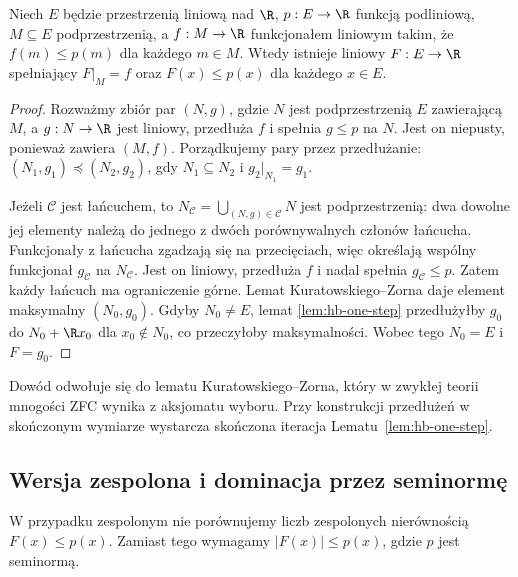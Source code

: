 \begin{twierdzenie}
\label{thm:hb-real}
Niech $E$ będzie przestrzenią liniową nad $\R$,
$p:E\to\R$ funkcją podliniową, $M\subseteq E$ podprzestrzenią,
a $f:M\to\R$ funkcjonałem liniowym takim, że
$f(m)\le p(m)$ dla każdego $m\in M$.
Wtedy istnieje liniowy $F:E\to\R$ spełniający
$F|_M=f$ oraz $F(x)\le p(x)$ dla każdego $x\in E$.
\end{twierdzenie}
\begin{proof}
Rozważmy zbiór par $(N,g)$, gdzie $N$ jest podprzestrzenią
$E$ zawierającą $M$, a $g:N\to\R$ jest liniowy, przedłuża
$f$ i spełnia $g\le p$ na $N$. Jest on niepusty, ponieważ
zawiera $(M,f)$. Porządkujemy pary przez przedłużanie:
$(N_1,g_1)\preceq(N_2,g_2)$, gdy $N_1\subseteq N_2$
i $g_2|_{N_1}=g_1$.

Jeżeli $\mathcal C$ jest łańcuchem, to $N_\mathcal C=
\bigcup_{(N,g)\in\mathcal C}N$ jest podprzestrzenią:
dwa dowolne jej elementy należą do jednego z dwóch
porównywalnych członów łańcucha. Funkcjonały z łańcucha
zgadzają się na przecięciach, więc określają wspólny
funkcjonał $g_\mathcal C$ na $N_\mathcal C$.
Jest on liniowy, przedłuża $f$ i nadal spełnia
$g_\mathcal C\le p$. Zatem każdy łańcuch ma ograniczenie
górne. Lemat Kuratowskiego--Zorna daje element maksymalny
$(N_0,g_0)$. Gdyby $N_0\ne E$, lemat
\ref{lem:hb-one-step} przedłużyłby $g_0$ do
$N_0+\R x_0$ dla $x_0\notin N_0$, co przeczyłoby
maksymalności. Wobec tego $N_0=E$ i $F=g_0$.
\end{proof}

\begin{uwaga}
Dowód odwołuje się do lematu Kuratowskiego--Zorna,
który w zwykłej teorii mnogości ZFC wynika z aksjomatu
wyboru. Przy konstrukcji przedłużeń w skończonym wymiarze
wystarcza skończona iteracja Lematu~\ref{lem:hb-one-step}.
\end{uwaga}

\subsection{Wersja zespolona i dominacja przez seminormę}

W przypadku zespolonym nie porównujemy liczb zespolonych
nierównością $F(x)\le p(x)$. Zamiast tego wymagamy
$|F(x)|\le p(x)$, gdzie $p$ jest seminormą.

